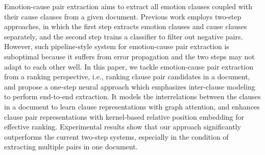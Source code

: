 Emotion-cause pair extraction aims to extract all emotion clauses coupled with their cause clauses from a given document. Previous work employs two-step approaches, in which the first step extracts emotion clauses and cause clauses separately, and the second step trains a classifier to filter out negative pairs. However, such pipeline-style system for emotion-cause pair extraction is suboptimal because it suffers from error propagation and the two steps may not adapt to each other well. In this paper, we tackle emotion-cause pair extraction from a ranking perspective, i.e., ranking clause pair candidates in a document, and propose a one-step neural approach which emphasizes inter-clause modeling to perform end-to-end extraction. It models the interrelations between the clauses in a document to learn clause representations with graph attention, and enhances clause pair representations with kernel-based relative position embedding for effective ranking. Experimental results show that our approach significantly outperforms the current two-step systems, especially in the condition of extracting multiple pairs in one document.
